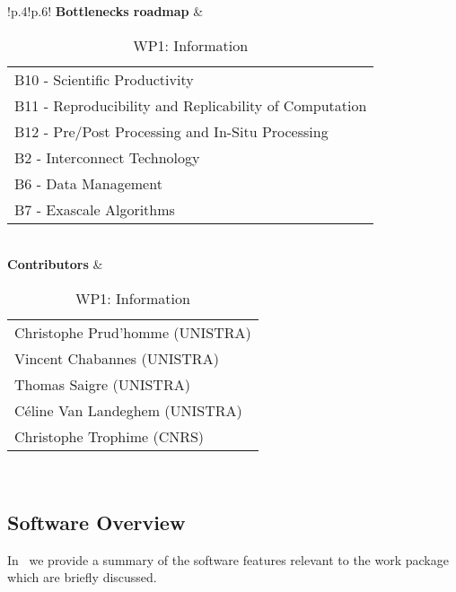 \begin{table}[!ht]
{{\begin{tabular}{!{\color{numpexgray}\vrule}p{.4\textwidth}!{\color{numpexgray}\vrule}p{.6\textwidth}!{\color{numpexgray}\vrule}}
        \textbf{Bottlenecks roadmap} & \begin{tabular}{l}
B10 - Scientific Productivity\\
B11 - Reproducibility and Replicability of Computation\\
B12 - Pre/Post Processing and In-Situ Processing\\
B2 - Interconnect Technology\\
B6 - Data Management\\
B7 - Exascale Algorithms\\
\end{tabular} \\
\textbf{Contributors} & \begin{tabular}{l}
    Christophe Prud'homme (UNISTRA)\\
    Vincent Chabannes (UNISTRA)\\
    Thomas Saigre (UNISTRA)\\
    Céline Van Landeghem (UNISTRA)\\
    Christophe Trophime (CNRS)\\
\end{tabular}\\
        \hline
    \end{tabular}
    }}
    \caption{WP1: \Feelpp{} Information}
\end{table}

\subsection{Software Overview}
\label{sec:WP1:Feelpp:summary}

In~ we provide a summary of the software features relevant to the work package which are briefly discussed.

